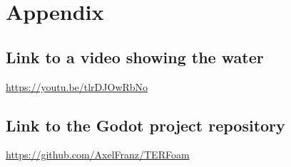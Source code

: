 \documentclass{article}
\begin{document}



\section{Appendix}

\subsection{Link to a video showing the water} \label{video:1}
\href{https://youtu.be/tlrDJOwRbNo}{https://youtu.be/tlrDJOwRbNo}

\subsection{Link to the Godot project repository}
\href{https://github.com/AxelFranz/TERFoam}{https://github.com/AxelFranz/TERFoam}
\end{document}
